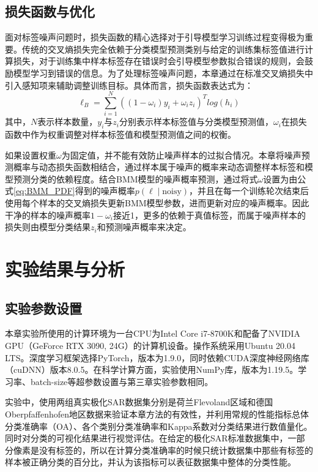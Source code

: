 \subsection{损失函数与优化}
面对标签噪声问题时，损失函数的精心选择对于引导模型学习训练过程变得极为重要。传统的交叉熵损失完全依赖于分类模型预测类别与给定的训练集标签值进行计算损失，对于训练集中样本标签存在错误时会引导模型参数拟合错误的规则，会鼓励模型学习到错误的信息。为了处理标签噪声问题，本章通过在标准交叉熵损失中引入感知项来辅助调整训练目标。具体而言，损失函数表达式为：
\begin{equation}
    \ell_B=\sum_{i=1}^{N}((1-\omega_i)y_i+\omega_iz_i)^Tlog(h_i)
\end{equation}
其中，$N$表示样本数量，$y_i$与$z_i$分别表示样本标签值与分类模型预测值，$\omega_i$在损失函数中作为权重调整对样本标签值和模型预测值之间的权衡。

如果设置权重$\omega$为固定值，并不能有效防止噪声样本的过拟合情况。本章将噪声预测概率与动态损失函数相结合，通过样本属于噪声的概率来动态调整样本标签和模型预测分类的依赖程度。结合BMM模型的噪声概率预测，通过将式$\omega$设置为由公式\ref{eq:BMM_PDF}得到的噪声概率$p(\ell \mid \text{noisy})$，并且在每一个训练轮次结束后使用每个样本的交叉熵损失更新BMM模型参数，进而更新对应的噪声概率。因此干净的样本的噪声概率$1-\omega_i$接近1，更多的依赖于真值标签，而属于噪声样本的损失则由模型分类结果$z_i$和预测噪声概率来决定。

\section{实验结果与分析}
\subsection{实验参数设置}
本章实验所使用的计算环境为一台CPU为Intel Core i7-8700K和配备了NVIDIA GPU（GeForce RTX 3090, 24G）的计算机设备。操作系统采用Ubuntu 20.04 LTS。深度学习框架选择PyTorch，版本为1.9.0，同时依赖CUDA深度神经网络库（cuDNN）版本8.0.5。在科学计算方面，实验使用NumPy库，版本为1.19.5。学习率、batch-size等超参数设置与第三章实验参数相同。

实验中，使用两组真实极化SAR数据集分别是荷兰Flevoland区域和德国Oberpfaffenhofen地区数据来验证本章方法的有效性，并利用常规的性能指标总体分类准确率（OA）、各个类别分类准确率和Kappa系数对分类结果进行数值量化。同时对分类的可视化结果进行视觉评估。在给定的极化SAR标准数据集中，一部分像素是没有标签的，所以在计算分类准确率的时候只统计数据集中那些有标签的样本被正确分类的百分比，并认为该指标可以表征数据集中整体的分类性能。

